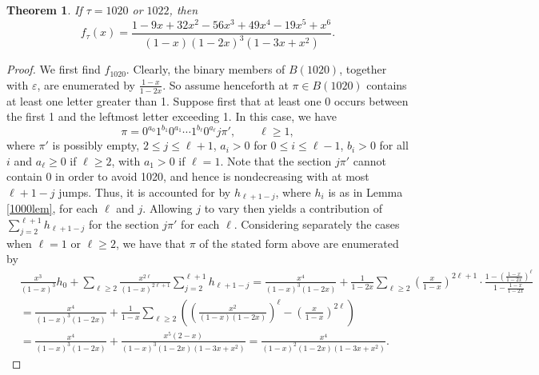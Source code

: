 \documentclass{article}
\theoremstyle{remark}
\theoremstyle{plain}
\newtheorem{theorem}{Theorem}[section]
\begin{document}
\begin{theorem}\label{1020th}
If $\tau=1020$ or $1022$, then
\begin{equation}\label{1020the1}
f_\tau(x)=\frac{1-9x+32x^2-56x^3+49x^4-19x^5+x^6}{(1-x)(1-2x)^3(1-3x+x^2)}.
\end{equation}
\end{theorem}
\begin{proof}
We first find $f_{1020}$.  Clearly, the binary members of $B(1020)$, together with $\varepsilon$, are enumerated by $\frac{1-x}{1-2x}$.  So assume henceforth at $\pi \in B(1020)$ contains at least one letter greater than 1.  Suppose first that at least one 0 occurs between the first 1 and the leftmost letter exceeding 1.  In this case, we have
$$\pi=0^{a_0}1^{b_1}0^{a_1}\cdots1^{b_\ell}0^{a_\ell}j\pi', \qquad \ell \geq 1,$$
where $\pi'$ is possibly empty, $2 \leq j \leq \ell+1$, $a_i>0$ for $0 \leq i \leq \ell-1$, $b_i>0$ for all $i$ and $a_\ell \geq0$ if $\ell \geq 2$, with $a_1>0$ if $\ell=1$.  Note that the section $j\pi'$ cannot contain 0 in order to avoid 1020, and hence is nondecreasing with at most $\ell+1-j$ jumps.  Thus, it is accounted for by $h_{\ell+1-j}$, where $h_i$ is as in Lemma \ref{1000lem}, for each $\ell$ and $j$.   Allowing $j$ to vary then yields a contribution of $\sum_{j=2}^{\ell+1}h_{\ell+1-j}$ for the section $j\pi'$ for each $\ell$.  Considering separately the cases when $\ell=1$ or $\ell \geq 2$, we have that $\pi$ of the stated form above are enumerated by
\begin{align*}
&\frac{x^3}{(1-x)^3}h_0+\sum_{\ell \geq 2}\frac{x^{2\ell}}{(1-x)^{2\ell+1}}\sum_{j=2}^{\ell+1}h_{\ell+1-j}=\frac{x^4}{(1-x)^3(1-2x)}+\frac{1}{1-2x}\sum_{\ell \geq2}\left(\frac{x}{1-x}\right)^{2\ell+1}\cdot\frac{1-\left(\frac{1-x}{1-2x}\right)^\ell}{1-\frac{1-x}{1-2x}}\\
&=\frac{x^4}{(1-x)^3(1-2x)}+\frac{1}{1-x}\sum_{\ell \geq2}\left(\left(\frac{x^2}{(1-x)(1-2x)}\right)^\ell-\left(\frac{x}{1-x}\right)^{2\ell}\right)\\
&=\frac{x^4}{(1-x)^3(1-2x)}+\frac{x^5(2-x)}{(1-x)^3(1-2x)(1-3x+x^2)}=\frac{x^4}{(1-x)^2(1-2x)(1-3x+x^2)}.
\end{align*}


\end{proof}
\end{document}
